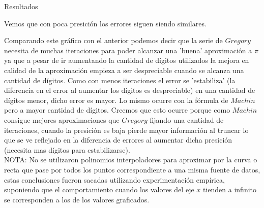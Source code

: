 \begin{section}{Resultados}
	\VSP
	
	Vemos que con poca presición los errores siguen siendo similares.
	
	Comparando este gráfico con el anterior podemos decir que la serie de $Gregory$ necesita de muchas iteraciones para poder alcanzar una 'buena' aproximación a $\pi$ ya que a pesar de ir aumentando la cantidad de dígitos utilizados la mejora en calidad de la aproximación empieza a ser despreciable cuando se alcanza una cantidad de dígitos.
	Como con menos iteraciones el error se 'estabiliza' (la diferencia en el error al aumentar los dígitos es despreciable) en una cantidad de dígitos menor, dicho error es mayor. Lo mismo ocurre con la fórmula de $Machin$ pero a mayor cantidad de dígitos. Creemos que esto ocurre porque como $Machin$ consigue mejores aproximaciones que $Gregory$ fijando una cantidad de iteraciones, cuando la presición es baja pierde mayor información al truncar lo que se ve reflejado en la diferencia de errores al aumentar dicha presición (necesita mas dígitos para estabilizarse).\\

	NOTA: No se utilizaron polinomios interpoladores para aproximar por la curva o recta que pase por todos los puntos correspondiente a una misma fuente de datos, estas conclusiones fueron sacadas utilizando experimentación empírica, suponiendo que el comportamiento cuando los valores del eje $x$ tienden a infinito se corresponden a los de los valores graficados.

\end{section}
